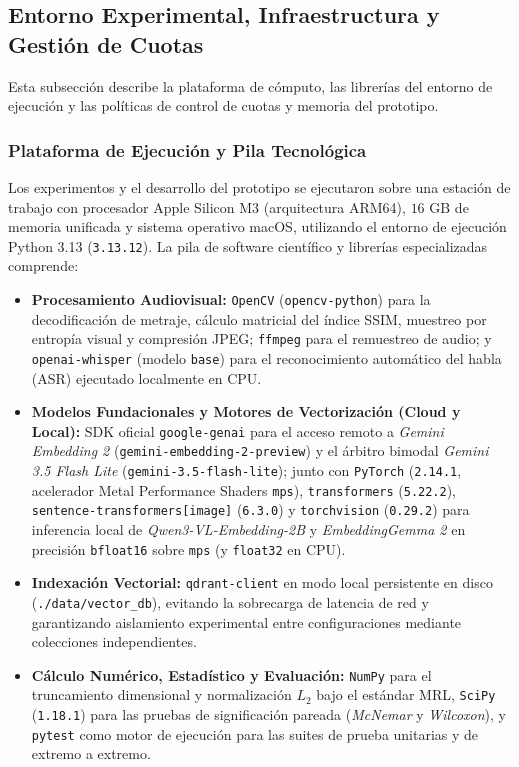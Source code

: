 \subsection{Entorno Experimental, Infraestructura y Gestión de Cuotas}
\label{subsec:entorno_experimental_infraestructura}

Esta subsección describe la plataforma de cómputo, las librerías del entorno de ejecución y las políticas de control de cuotas y memoria del prototipo.

\subsubsection{Plataforma de Ejecución y Pila Tecnológica}
Los experimentos y el desarrollo del prototipo se ejecutaron sobre una estación de trabajo con procesador Apple Silicon M3 (arquitectura ARM64), $16\text{ GB}$ de memoria unificada y sistema operativo macOS, utilizando el entorno de ejecución Python 3.13 (\texttt{3.13.12}). La pila de software científico y librerías especializadas comprende:
\begin{itemize}
    \item \textbf{Procesamiento Audiovisual:} \texttt{OpenCV} (\texttt{opencv-python}) para la decodificación de metraje, cálculo matricial del índice SSIM, muestreo por entropía visual y compresión JPEG; \texttt{ffmpeg} para el remuestreo de audio; y \texttt{openai-whisper} (modelo \texttt{base}) para el reconocimiento automático del habla (ASR) ejecutado localmente en CPU.
    \item \textbf{Modelos Fundacionales y Motores de Vectorización (Cloud y Local):} SDK oficial \texttt{google-genai} para el acceso remoto a \textit{Gemini Embedding 2} (\texttt{gemini-embedding-2-preview}) y el árbitro bimodal \textit{Gemini 3.5 Flash Lite} (\texttt{gemini-3.5-flash-lite}); junto con \texttt{PyTorch} (\texttt{2.14.1}, acelerador Metal Performance Shaders \texttt{mps}), \texttt{transformers} (\texttt{5.22.2}), \texttt{sentence-transformers[image]} (\texttt{6.3.0}) y \texttt{torchvision} (\texttt{0.29.2}) para inferencia local de \textit{Qwen3-VL-Embedding-2B} y \textit{EmbeddingGemma 2} en precisión \texttt{bfloat16} sobre \texttt{mps} (y \texttt{float32} en CPU).
    \item \textbf{Indexación Vectorial:} \texttt{qdrant-client} en modo local persistente en disco (\texttt{./data/vector\_db}), evitando la sobrecarga de latencia de red y garantizando aislamiento experimental entre configuraciones mediante colecciones independientes.
    \item \textbf{Cálculo Numérico, Estadístico y Evaluación:} \texttt{NumPy} para el truncamiento dimensional y normalización $L_2$ bajo el estándar MRL, \texttt{SciPy} (\texttt{1.18.1}) para las pruebas de significación pareada (\textit{McNemar} y \textit{Wilcoxon}), y \texttt{pytest} como motor de ejecución para las suites de prueba unitarias y de extremo a extremo.
\end{itemize}

